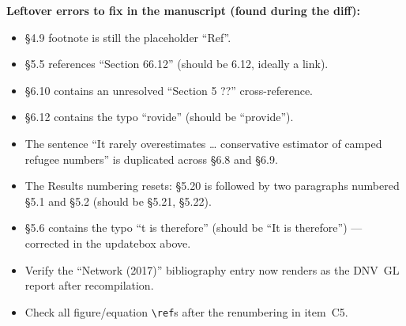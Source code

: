 \documentclass[11pt,a4paper]{article}
\begin{document}
\begin{flagbox}
\textbf{Leftover errors to fix in the manuscript (found during the diff):}
\begin{itemize}
  \item §4.9 footnote is still the placeholder ``Ref''.
  \item §5.5 references ``Section 66.12'' (should be 6.12, ideally a link).
  \item §6.10 contains an unresolved ``Section 5 ??'' cross-reference.
  \item §6.12 contains the typo ``rovide'' (should be ``provide'').
  \item The sentence ``It rarely overestimates \ldots{} conservative estimator of camped refugee numbers'' is
        duplicated across §6.8 and §6.9.
  \item The Results numbering resets: §5.20 is followed by two paragraphs numbered §5.1 and §5.2 (should be §5.21,
        §5.22).
  \item §5.6 contains the typo ``t is therefore'' (should be ``It is therefore'') --- corrected in the updatebox
        above.
  \item Verify the ``Network (2017)'' bibliography entry now renders as the DNV~GL report after recompilation.
  \item Check all figure/equation \texttt{\textbackslash ref}s after the renumbering in item~C5.
\end{itemize}
\end{flagbox}
\end{document}
